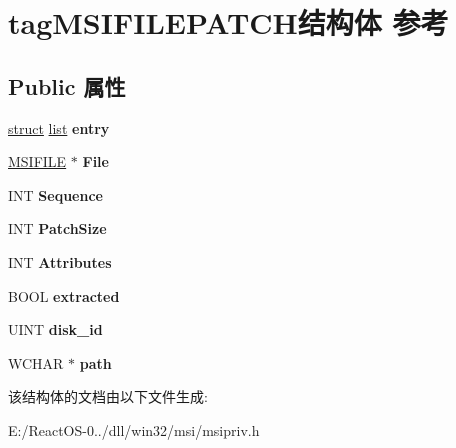 \hypertarget{structtag_m_s_i_f_i_l_e_p_a_t_c_h}{}\section{tag\+M\+S\+I\+F\+I\+L\+E\+P\+A\+T\+C\+H结构体 参考}
\label{structtag_m_s_i_f_i_l_e_p_a_t_c_h}
\subsection*{Public 属性}
\begin{DoxyCompactItemize}
\item 
\mbox{\label{structtag_m_s_i_f_i_l_e_p_a_t_c_h_acb81c323b059690c68b70488555d1b1c}} 
\hyperlink{interfacestruct}{struct} \hyperlink{classlist}{list} {\bfseries entry}
\item 
\mbox{\label{structtag_m_s_i_f_i_l_e_p_a_t_c_h_a01e7c299e1dc1f138d6c05b1cbf5adcc}} 
\hyperlink{structtag_m_s_i_f_i_l_e}{M\+S\+I\+F\+I\+LE} $\ast$ {\bfseries File}
\item 
\mbox{\label{structtag_m_s_i_f_i_l_e_p_a_t_c_h_a3922a8a85cf503a50ad24f351fdd266e}} 
I\+NT {\bfseries Sequence}
\item 
\mbox{\label{structtag_m_s_i_f_i_l_e_p_a_t_c_h_ae6528564c0f320cc3d475bc2d7dafbe6}} 
I\+NT {\bfseries Patch\+Size}
\item 
\mbox{\label{structtag_m_s_i_f_i_l_e_p_a_t_c_h_a92ecdf78584f0bffcf7e2f71550cc8dc}} 
I\+NT {\bfseries Attributes}
\item 
\mbox{\label{structtag_m_s_i_f_i_l_e_p_a_t_c_h_a26d6170881ef2abc088c48b3dc412924}} 
B\+O\+OL {\bfseries extracted}
\item 
\mbox{\label{structtag_m_s_i_f_i_l_e_p_a_t_c_h_a3a86b5e0d883c6439bb581fe44fd4ad4}} 
U\+I\+NT {\bfseries disk\+\_\+id}
\item 
\mbox{\label{structtag_m_s_i_f_i_l_e_p_a_t_c_h_abc32737561a688a861138d2cf3c36dda}} 
W\+C\+H\+AR $\ast$ {\bfseries path}
\end{DoxyCompactItemize}


该结构体的文档由以下文件生成\+:\begin{DoxyCompactItemize}
\item 
E\+:/\+React\+O\+S-\/0../dll/win32/msi/msipriv.\+h\end{DoxyCompactItemize}
